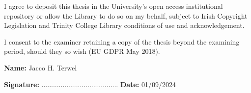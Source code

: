 \begin{declaration}      

%
%
%
I agree to deposit this thesis in the University's open access institutional repository or allow the Library to do so on my behalf, subject to Irish Copyright Legislation and Trinity College Library conditions of use and acknowledgement.

I consent to the examiner retaining a copy of the thesis beyond the examining period, should they so wish (EU GDPR May 2018). 

\vspace{30mm}

\textbf{Name:} Jacco H. Terwel

\vspace{15mm}

\textbf{Signature:}  ........................................		\textbf{Date:}  01/09/2024

\end{declaration}

\newpage
\thispagestyle{empty}
\mbox{}

